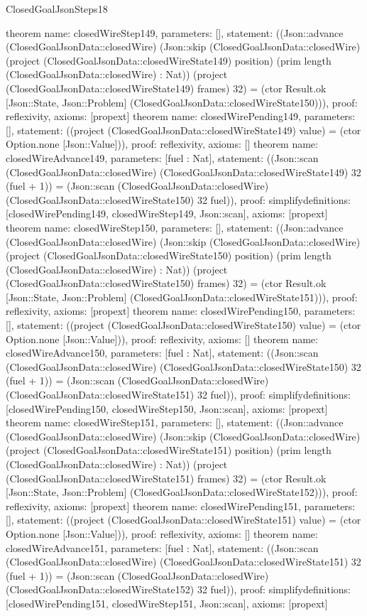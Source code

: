 \begin{lexlean}{ClosedGoalJsonSteps18}
\begin{semanticmodule}
{}
theorem{
 name: closedWireStep149, parameters: [],
 statement: ((Json::advance (ClosedGoalJsonData::closedWire) (Json::skip (ClosedGoalJsonData::closedWire) (project (ClosedGoalJsonData::closedWireState149) position) (prim length (ClosedGoalJsonData::closedWire) : Nat)) (project (ClosedGoalJsonData::closedWireState149) frames) 32) = (ctor Result.ok [Json::State, Json::Problem] (ClosedGoalJsonData::closedWireState150))), proof: reflexivity{}, axioms: [propext]
}
theorem{
 name: closedWirePending149, parameters: [],
 statement: ((project (ClosedGoalJsonData::closedWireState149) value) = (ctor Option.none [Json::Value])), proof: reflexivity{}, axioms: []
}
theorem{
 name: closedWireAdvance149, parameters: [fuel : Nat],
 statement: ((Json::scan (ClosedGoalJsonData::closedWire) (ClosedGoalJsonData::closedWireState149) 32 (fuel + 1)) = (Json::scan (ClosedGoalJsonData::closedWire) (ClosedGoalJsonData::closedWireState150) 32 fuel)), proof: simplify{definitions: [closedWirePending149, closedWireStep149, Json::scan]}, axioms: [propext]
}
theorem{
 name: closedWireStep150, parameters: [],
 statement: ((Json::advance (ClosedGoalJsonData::closedWire) (Json::skip (ClosedGoalJsonData::closedWire) (project (ClosedGoalJsonData::closedWireState150) position) (prim length (ClosedGoalJsonData::closedWire) : Nat)) (project (ClosedGoalJsonData::closedWireState150) frames) 32) = (ctor Result.ok [Json::State, Json::Problem] (ClosedGoalJsonData::closedWireState151))), proof: reflexivity{}, axioms: [propext]
}
theorem{
 name: closedWirePending150, parameters: [],
 statement: ((project (ClosedGoalJsonData::closedWireState150) value) = (ctor Option.none [Json::Value])), proof: reflexivity{}, axioms: []
}
theorem{
 name: closedWireAdvance150, parameters: [fuel : Nat],
 statement: ((Json::scan (ClosedGoalJsonData::closedWire) (ClosedGoalJsonData::closedWireState150) 32 (fuel + 1)) = (Json::scan (ClosedGoalJsonData::closedWire) (ClosedGoalJsonData::closedWireState151) 32 fuel)), proof: simplify{definitions: [closedWirePending150, closedWireStep150, Json::scan]}, axioms: [propext]
}
theorem{
 name: closedWireStep151, parameters: [],
 statement: ((Json::advance (ClosedGoalJsonData::closedWire) (Json::skip (ClosedGoalJsonData::closedWire) (project (ClosedGoalJsonData::closedWireState151) position) (prim length (ClosedGoalJsonData::closedWire) : Nat)) (project (ClosedGoalJsonData::closedWireState151) frames) 32) = (ctor Result.ok [Json::State, Json::Problem] (ClosedGoalJsonData::closedWireState152))), proof: reflexivity{}, axioms: [propext]
}
theorem{
 name: closedWirePending151, parameters: [],
 statement: ((project (ClosedGoalJsonData::closedWireState151) value) = (ctor Option.none [Json::Value])), proof: reflexivity{}, axioms: []
}
theorem{
 name: closedWireAdvance151, parameters: [fuel : Nat],
 statement: ((Json::scan (ClosedGoalJsonData::closedWire) (ClosedGoalJsonData::closedWireState151) 32 (fuel + 1)) = (Json::scan (ClosedGoalJsonData::closedWire) (ClosedGoalJsonData::closedWireState152) 32 fuel)), proof: simplify{definitions: [closedWirePending151, closedWireStep151, Json::scan]}, axioms: [propext]
}
\end{semanticmodule}
\end{lexlean}
